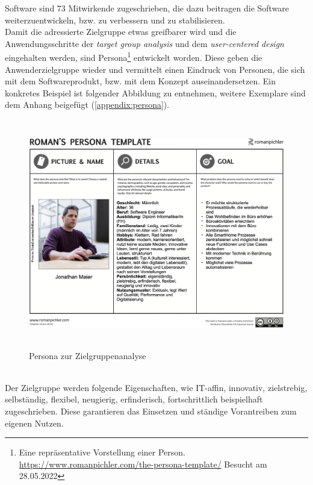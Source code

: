         Software sind 73 Mitwirkende zugeschrieben, die dazu beitragen die Software weiterzuentwickeln, bzw. zu verbessern und zu 
        stabilisieren.
    \\
    \linebreak 
    Damit die adressierte Zielgruppe etwas greifbarer wird und die Anwendungsschritte der \textit{target group analysis} und 
    dem \textit{user-centered design} eingehalten werden, sind Persona\footnote{Eine repräsentative Vorstellung einer Person. \url{https://www.romanpichler.com/the-persona-template/} Besucht am 28.05.2022} 
    entwickelt worden. Diese geben die Anwenderzielgruppe wieder und vermittelt einen Eindruck von Personen, die sich mit dem 
    Softwareprodukt, bzw. mit dem Konzept auseinandersetzen. Ein konkretes Beispiel ist folgender Abbildung zu entnehmen, weitere Exemplare sind dem Anhang beigefügt (\ref{appendix:persona}).
    \\
    \pagebreak
    \linebreak
    \begin{figure}[hbt!]
        \centering
        \includegraphics[width=15cm,height=10cm,keepaspectratio]{chapter/9Anhang/Persona-4_MA.png}
        \caption{Persona zur Zielgruppenanalyse}
        \label{fig:persona}
    \end{figure}
    \\
    Der Zielgruppe werden folgende Eigenschaften, wie IT-affin, innovativ, zielstrebig, selbständig, flexibel, neugierig, erfinderisch, fortschrittlich beispielhaft zugeschrieben. 
    Diese garantieren das Einsetzen und ständige Vorantreiben zum eigenen Nutzen. 

